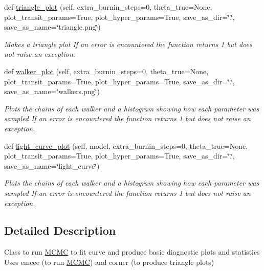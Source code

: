 \begin{DoxyCompactItemize}
def \hyperlink{classexospec_1_1mcmc_1_1_m_c_m_c_af240e8deac4470da704239926ea56822}{triangle\+\_\+plot} (self, extra\+\_\+burnin\+\_\+steps=0, theta\+\_\+true=None, plot\+\_\+transit\+\_\+params=True, plot\+\_\+hyper\+\_\+params=True, save\+\_\+as\+\_\+dir=\char`\"{}.\char`\"{}, save\+\_\+as\+\_\+name=\char`\"{}triangle.\+png\char`\"{})
\begin{DoxyCompactList}\small\item\em Makes a triangle plot If an error is encountered the function returns 1 but does not raise an exception. \end{DoxyCompactList}\item 
def \hyperlink{classexospec_1_1mcmc_1_1_m_c_m_c_a741c2882baef53c1fa19b2c086ec8261}{walker\+\_\+plot} (self, extra\+\_\+burnin\+\_\+steps=0, theta\+\_\+true=None, plot\+\_\+transit\+\_\+params=True, plot\+\_\+hyper\+\_\+params=True, save\+\_\+as\+\_\+dir=\char`\"{}.\char`\"{}, save\+\_\+as\+\_\+name=\char`\"{}walkers.\+png\char`\"{})
\begin{DoxyCompactList}\small\item\em Plots the chains of each walker and a histogram showing how each parameter was sampled If an error is encountered the function returns 1 but does not raise an exception. \end{DoxyCompactList}\item 
def \hyperlink{classexospec_1_1mcmc_1_1_m_c_m_c_ab2c5cc870e2b384534404f3bc667e039}{light\+\_\+curve\+\_\+plot} (self, model, extra\+\_\+burnin\+\_\+steps=0, theta\+\_\+true=None, plot\+\_\+transit\+\_\+params=True, plot\+\_\+hyper\+\_\+params=True, save\+\_\+as\+\_\+dir=\char`\"{}.\char`\"{}, save\+\_\+as\+\_\+name=\char`\"{}light\+\_\+curve\char`\"{})
\begin{DoxyCompactList}\small\item\em Plots the chains of each walker and a histogram showing how each parameter was sampled If an error is encountered the function returns 1 but does not raise an exception. \end{DoxyCompactList}\end{DoxyCompactItemize}


\subsection{Detailed Description}
Class to run \hyperlink{classexospec_1_1mcmc_1_1_m_c_m_c}{M\+C\+MC} to fit curve and produce basic diagnostic plots and statistics Uses emcee (to run \hyperlink{classexospec_1_1mcmc_1_1_m_c_m_c}{M\+C\+MC}) and corner (to produce triangle plots) 

